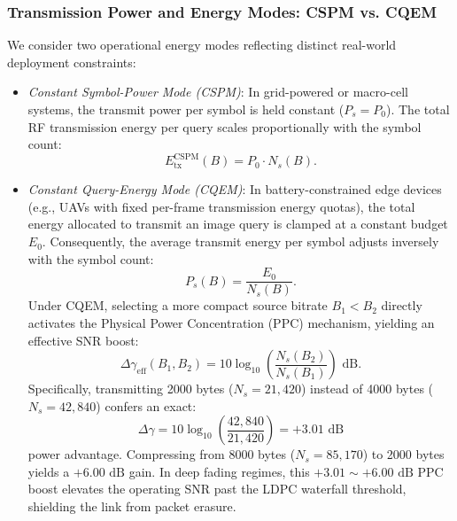 \subsubsection{Transmission Power and Energy Modes: CSPM vs. CQEM}
We consider two operational energy modes reflecting distinct real-world deployment constraints:
\begin{itemize}
    \item \textit{Constant Symbol-Power Mode (CSPM)}: In grid-powered or macro-cell systems, the transmit power per symbol is held constant ($P_s = P_0$). The total RF transmission energy per query scales proportionally with the symbol count:
    \begin{equation}
    E_{\mathrm{tx}}^{\mathrm{CSPM}}(B) = P_0 \cdot N_s(B).
    \end{equation}
    \item \textit{Constant Query-Energy Mode (CQEM)}: In battery-constrained edge devices (e.g., UAVs with fixed per-frame transmission energy quotas), the total energy allocated to transmit an image query is clamped at a constant budget $E_0$. Consequently, the average transmit energy per symbol adjusts inversely with the symbol count:
    \begin{equation}
    P_s(B) = \frac{E_0}{N_s(B)}.
    \end{equation}
    Under CQEM, selecting a more compact source bitrate $B_1 < B_2$ directly activates the Physical Power Concentration (PPC) mechanism, yielding an effective SNR boost:
    \begin{equation}\label{eq:snr_gain}
    \Delta \gamma_{\mathrm{eff}}(B_1, B_2) = 10 \log_{10}\left(\frac{N_s(B_2)}{N_s(B_1)}\right) \text{ dB}.
    \end{equation}
    Specifically, transmitting 2000 bytes ($N_s = 21{,}420$) instead of 4000 bytes ($N_s = 42{,}840$) confers an exact:
    \begin{equation}
    \Delta \gamma = 10 \log_{10}\left(\frac{42{,}840}{21{,}420}\right) = +3.01\text{ dB}
    \end{equation}
    power advantage. Compressing from 8000 bytes ($N_s = 85{,}170$) to 2000 bytes yields a $+6.00\text{ dB}$ gain. In deep fading regimes, this $+3.01\sim+6.00\text{ dB}$ PPC boost elevates the operating SNR past the LDPC waterfall threshold, shielding the link from packet erasure.
\end{itemize}

